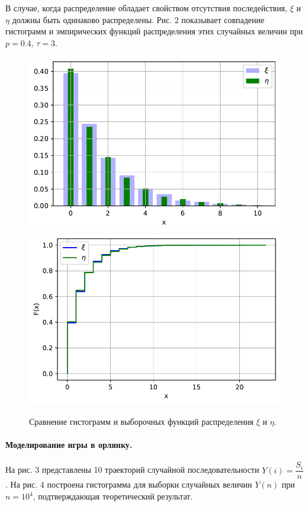 \documentclass[16pt]{article}
\begin{document}
В случае, когда распределение обладает свойством отсутствия последействия, $\xi$ и $\eta$ должны быть одинаково распределены. Рис. 2 показывает совпадение гистограмм и эмпирических функций распределения этих случайных величин при $p = 0.4,\, \tau = 3$.
\begin{figure}[h]
	\center
    \includegraphics[scale=0.5]{1_2.pdf}
    \hfill
    \includegraphics[scale=0.5]{1_3.pdf}
    \caption{Сравнение гистограмм и выборочных функций распределения $\xi$ и $\eta$.}
\end{figure}

\paragraph{Моделирование игры в орлянку.}
На рис. 3 представлены 10 траекторий случайной последовательности $Y(i) = \dfrac{S_i}{n}$. На рис. 4 построена гистограмма для выборки случайных величин $Y(n)$ при $n = 10^4$, подтверждающая теоретический результат.
\end{document}
